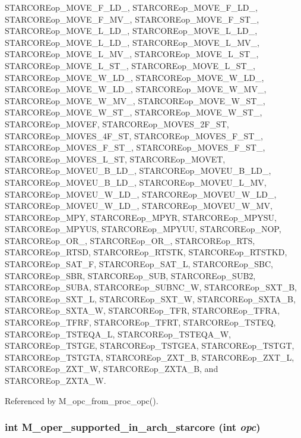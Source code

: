 STARCOREop\_\-MOVE\_\-F\_\-LD\_, STARCOREop\_\-MOVE\_\-F\_\-LD\_, STARCOREop\_\-MOVE\_\-F\_\-MV\_, STARCOREop\_\-MOVE\_\-F\_\-ST\_, STARCOREop\_\-MOVE\_\-L\_\-LD\_, STARCOREop\_\-MOVE\_\-L\_\-LD\_, STARCOREop\_\-MOVE\_\-L\_\-LD\_, STARCOREop\_\-MOVE\_\-L\_\-MV\_, STARCOREop\_\-MOVE\_\-L\_\-MV\_, STARCOREop\_\-MOVE\_\-L\_\-ST\_, STARCOREop\_\-MOVE\_\-L\_\-ST\_, STARCOREop\_\-MOVE\_\-L\_\-ST\_, STARCOREop\_\-MOVE\_\-W\_\-LD\_, STARCOREop\_\-MOVE\_\-W\_\-LD\_, STARCOREop\_\-MOVE\_\-W\_\-LD\_, STARCOREop\_\-MOVE\_\-W\_\-MV\_, STARCOREop\_\-MOVE\_\-W\_\-MV\_, STARCOREop\_\-MOVE\_\-W\_\-ST\_, STARCOREop\_\-MOVE\_\-W\_\-ST\_, STARCOREop\_\-MOVE\_\-W\_\-ST\_, STARCOREop\_\-MOVEF, STARCOREop\_\-MOVES\_\-2F\_\-ST, STARCOREop\_\-MOVES\_\-4F\_\-ST, STARCOREop\_\-MOVES\_\-F\_\-ST\_, STARCOREop\_\-MOVES\_\-F\_\-ST\_, STARCOREop\_\-MOVES\_\-F\_\-ST\_, STARCOREop\_\-MOVES\_\-L\_\-ST, STARCOREop\_\-MOVET, STARCOREop\_\-MOVEU\_\-B\_\-LD\_, STARCOREop\_\-MOVEU\_\-B\_\-LD\_, STARCOREop\_\-MOVEU\_\-B\_\-LD\_, STARCOREop\_\-MOVEU\_\-L\_\-MV, STARCOREop\_\-MOVEU\_\-W\_\-LD\_, STARCOREop\_\-MOVEU\_\-W\_\-LD\_, STARCOREop\_\-MOVEU\_\-W\_\-LD\_, STARCOREop\_\-MOVEU\_\-W\_\-MV, STARCOREop\_\-MPY, STARCOREop\_\-MPYR, STARCOREop\_\-MPYSU, STARCOREop\_\-MPYUS, STARCOREop\_\-MPYUU, STARCOREop\_\-NOP, STARCOREop\_\-OR\_, STARCOREop\_\-OR\_, STARCOREop\_\-RTS, STARCOREop\_\-RTSD, STARCOREop\_\-RTSTK, STARCOREop\_\-RTSTKD, STARCOREop\_\-SAT\_\-F, STARCOREop\_\-SAT\_\-L, STARCOREop\_\-SBC, STARCOREop\_\-SBR, STARCOREop\_\-SUB, STARCOREop\_\-SUB2, STARCOREop\_\-SUBA, STARCOREop\_\-SUBNC\_\-W, STARCOREop\_\-SXT\_\-B, STARCOREop\_\-SXT\_\-L, STARCOREop\_\-SXT\_\-W, STARCOREop\_\-SXTA\_\-B, STARCOREop\_\-SXTA\_\-W, STARCOREop\_\-TFR, STARCOREop\_\-TFRA, STARCOREop\_\-TFRF, STARCOREop\_\-TFRT, STARCOREop\_\-TSTEQ, STARCOREop\_\-TSTEQA\_\-L, STARCOREop\_\-TSTEQA\_\-W, STARCOREop\_\-TSTGE, STARCOREop\_\-TSTGEA, STARCOREop\_\-TSTGT, STARCOREop\_\-TSTGTA, STARCOREop\_\-ZXT\_\-B, STARCOREop\_\-ZXT\_\-L, STARCOREop\_\-ZXT\_\-W, STARCOREop\_\-ZXTA\_\-B, and STARCOREop\_\-ZXTA\_\-W.

Referenced by M\_\-opc\_\-from\_\-proc\_\-opc().
\subsubsection{\setlength{\rightskip}{0pt plus 5cm}int M\_\-oper\_\-supported\_\-in\_\-arch\_\-starcore (int {\em opc})}\label{m__starcore_8h_1b9acf0e6a3c40984d67c2970758fec9}




